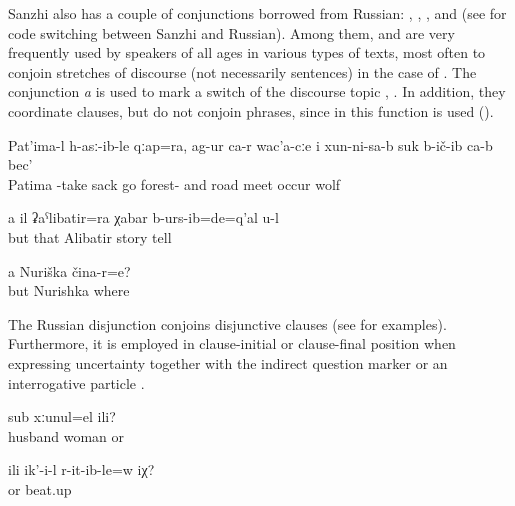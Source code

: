 Sanzhi also has a couple of conjunctions borrowed from Russian:  ,  ,  , and   (see \citet{ForkerSubmitteda} for code switching between Sanzhi and Russian). Among them,  and  are very frequently used by speakers of all ages in various types of texts, most often to conjoin stretches of discourse (not necessarily sentences) in the case of . The conjunction \textit{a} is used to mark a switch of the discourse topic , . In addition, they coordinate clauses, but do not conjoin phrases, since in this function  is used ().
%
\begin{exe}
	\ex	\label{ex:‎Patima took a sack and went into the forest and on the way she met a wolf minor}
	\gll	Pat'ima-l	h-asː-ib-le	qːap=ra,	ag-ur	ca-r	wac'a-cːe	i xun-ni-sa-b	suk	b-ič-ib	ca-b	bec'\\
		Patima	-take	sack	go		forest-	and	road	meet	occur		wolf\\
	\glt	{}

	\ex	\label{ex:and / but you also already told the story of Alibatir minor}
	\gll	a	il	ʡaˁlibatir=ra	χabar	b-urs-ib=de=q'al	u-l\\
		but	that	Alibatir	story	tell	\\
	\glt	{}

	\ex	\label{ex:‎And Nurishka, where is she minor}
	\gll	a	Nuriška	čina-r=e?\\
		but	Nurishka	where\\
	\glt	{}
\end{exe}

The Russian disjunction   conjoins disjunctive clauses (see  for examples). Furthermore, it is employed in clause-initial or clause-final position when expressing uncertainty together with the indirect question marker  or an interrogative particle .
%
\begin{exe}
	\ex	\label{ex:‎Or this is a married couple minor}
	\gll	sub	xːunul=el	ili?\\
		husband	woman	or\\
	\glt	{}

	\ex	\label{ex:Or did he beat her minor}
	\gll	ili	ik'-i-l	r-it-ib-le=w	iχ?\\
		or		beat.up	\\
	\glt	{}
\end{exe}

